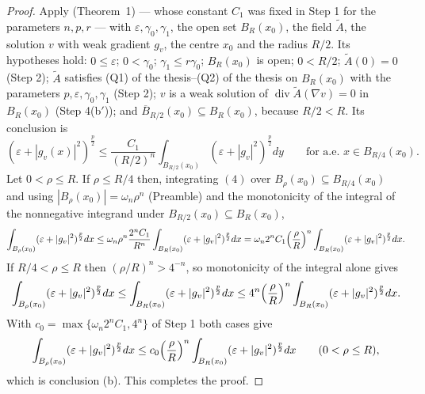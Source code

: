 \begin{proof}
Apply  (Theorem~1) --- whose constant $C_1$ was
fixed in Step 1 for the parameters $n,p,r$ --- with
$\varepsilon,\gamma_0,\gamma_1$, the open set $B_R(x_0)$, the field
$\widetilde A$, the solution $v$ with weak gradient $g_v$, the centre $x_0$ and
the radius $R/2$.  Its hypotheses hold: $0\le\varepsilon$; $0<\gamma_0$;
$\gamma_1\le r\gamma_0$; $B_R(x_0)$ is open; $0<R/2$; $\widetilde A(0)=0$
(Step 2); $\widetilde A$ satisfies (Q1) of the thesis--(Q2) of the thesis on $B_R(x_0)$
with the parameters $p,\varepsilon,\gamma_0,\gamma_1$ (Step 2); $v$ is a weak
solution of $\operatorname{div}\widetilde A(\nabla v)=0$ in $B_R(x_0)$
(Step 4(b$'$)); and $\overline B_{R/2}(x_0)\subseteq B_R(x_0)$, because
$R/2<R$.  Its conclusion is
\[
(\varepsilon+|g_v(x)|^2)^{\frac p2}
\le\frac{C_1}{(R/2)^n}\int_{B_{R/2}(x_0)}(\varepsilon+|g_v|^2)^{\frac p2}dy
\qquad\text{for a.e. }x\in B_{R/4}(x_0).
\tag{4}
\]
Let $0<\rho\le R$.  If $\rho\le R/4$ then, integrating $(4)$ over
$B_\rho(x_0)\subseteq B_{R/4}(x_0)$ and using
$|B_\rho(x_0)|=\omega_n\rho^n$ (Preamble) and the monotonicity of the integral
of the nonnegative integrand under $B_{R/2}(x_0)\subseteq B_R(x_0)$,
\[
\int_{B_\rho(x_0)}(\varepsilon+|g_v|^2)^{\frac p2}dx
\le\omega_n\rho^n\frac{2^nC_1}{R^n}\int_{B_{R}(x_0)}(\varepsilon+|g_v|^2)^{\frac p2}dx
=\omega_n2^nC_1\Bigl(\frac\rho R\Bigr)^n\int_{B_R(x_0)}(\varepsilon+|g_v|^2)^{\frac p2}dx .
\]
If $R/4<\rho\le R$ then $(\rho/R)^n>4^{-n}$, so monotonicity of the integral
alone gives
\[
\int_{B_\rho(x_0)}(\varepsilon+|g_v|^2)^{\frac p2}dx
\le\int_{B_R(x_0)}(\varepsilon+|g_v|^2)^{\frac p2}dx
\le4^n\Bigl(\frac\rho R\Bigr)^n\int_{B_R(x_0)}(\varepsilon+|g_v|^2)^{\frac p2}dx .
\]
With $c_0=\max\{\omega_n2^nC_1,4^n\}$ of Step 1 both cases give
\[
\int_{B_\rho(x_0)}(\varepsilon+|g_v|^2)^{\frac p2}dx
\le c_0\Bigl(\frac\rho R\Bigr)^{n}\int_{B_R(x_0)}(\varepsilon+|g_v|^2)^{\frac p2}dx
\qquad(0<\rho\le R),
\]
which is conclusion (b).  This completes the proof.
\end{proof}
